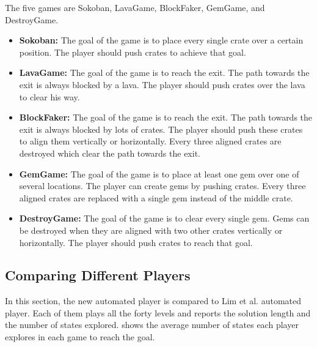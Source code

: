 
The five games are Sokoban, LavaGame, BlockFaker, GemGame, and DestroyGame.
\begin{itemize} \itemsep0pt \parskip0pt 
	\item \textbf{Sokoban:} The goal of the game is to place every single crate over a certain position. The player should push crates to achieve that goal.
	\item \textbf{LavaGame:} The goal of the game is to reach the exit. The path towards the exit is always blocked by a lava. The player should push crates over the lava to clear his way.
	\item \textbf{BlockFaker:} The goal of the game is to reach the exit. The path towards the exit is always blocked by lots of crates. The player should push these crates to align them vertically or horizontally. Every three aligned crates are destroyed which clear the path towards the exit.
	\item \textbf{GemGame:} The goal of the game is to place at least one gem over one of several locations. The player can create gems by pushing crates. Every three aligned crates are replaced with a single gem instead of the middle crate.
	\item \textbf{DestroyGame:} The goal of the game is to clear every single gem. Gems can be destroyed when they are aligned with two other crates vertically or horizontally. The player should push crates to reach that goal.
\end{itemize}

\subsection{Comparing Different Players}
In this section, the new automated player is compared to Lim et al.\cite{puzzleScriptGeneration} automated player. Each of them plays all the forty levels and reports the solution length and the number of states explored.  shows the average number of states each player explores in each game to reach the goal.


